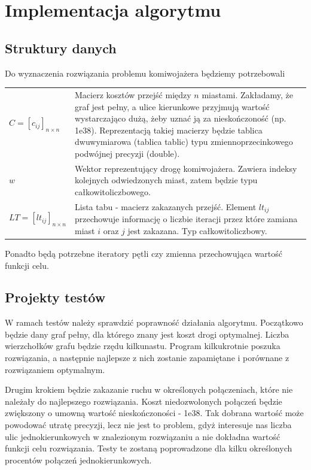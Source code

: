 \documentclass[11pt,a4paper,twoside]{article}
\begin{document}
\section{Implementacja algorytmu}

\subsection{Struktury danych}
Do wyznaczenia rozwiązania problemu komiwojażera będziemy potrzebowali
\bgroup
\def\arraystretch{1.5}
\begin{tabularx}{\textwidth}{l|X}
$C = [c_{ij}]_{n\times n}$ & Macierz kosztów przejść między $n$ miastami. Zakładamy, że graf jest pełny, a ulice kierunkowe przyjmują wartość wystarczająco dużą, żeby uznać ją za nieskończoność (np. 1e38). Reprezentacją takiej macierzy będzie tablica dwuwymiarowa (tablica tablic) typu zmiennoprzecinkowego podwójnej precyzji (double).\\
$w$ & Wektor reprezentujący drogę komiwojażera. Zawiera indeksy kolejnych odwiedzonych miast, zatem będzie typu całkowitoliczbowego. \\
$LT = [lt_{ij}]_{n\times n}$ & Lista tabu - macierz zakazanych przejść. Element $lt_{ij}$ przechowuje informację o liczbie iteracji przez które zamiana miast $i$ oraz $j$ jest zakazana. Typ całkowitoliczbowy.\\
\end{tabularx}
\egroup

Ponadto będą potrzebne iteratory pętli czy zmienna przechowująca wartość funkcji celu.

\subsection{Projekty testów}
W ramach testów należy sprawdzić poprawność działania algorytmu. Początkowo będzie dany graf pełny, dla którego znany jest koszt drogi optymalnej. Liczba wierzchołków grafu będzie rzędu kilkunastu. Program kilkukrotnie poszuka rozwiązania, a następnie najlepsze z nich zostanie zapamiętane i porównane z rozwiązaniem optymalnym.

Drugim krokiem będzie zakazanie ruchu w określonych połączeniach, które nie należały do najlepszego rozwiązania. Koszt niedozwolonych połączeń będzie zwiększony o umowną wartość nieskończoności - 1e38. Tak dobrana wartość może powodować utratę precyzji, lecz nie jest to problem, gdyż interesuje nas liczba ulic jednokierunkowych w znalezionym rozwiązaniu a nie dokładna wartość funkcji celu rozwiązania. Testy te zostaną poprowadzone dla kilku określonych procentów połączeń jednokierunkowych.
	
\end{document}
